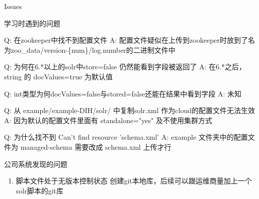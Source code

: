\documentclass[presentation]{beamer}
\begin{document}
\begin{frame}[label={sec:org7c8b5bf}]{Issues}
\begin{block}{学习时遇到的问题}
\begin{block}{Q: 在zookeeper中找不到配置文件}
A: 配置文件疑似在上传到zookeeper时放到了名为zoo\_data/version-\{num\}/log.number的二进制文件中
\end{block}


\begin{block}{Q: 为何在6.*以上的solr中store=false 仍然能看到字段被返回了}
A: 在6.*之后，string 的 docValues=true 为默认值
\end{block}


\begin{block}{Q: int类型为何docValues=false与stored=false还能在结果中看到字段}
A: 未知
\end{block}


\begin{block}{Q: 从 example/example-DIH/solr/ 中复制solr.xml 作为cloud的配置文件无法生效}
A: 因为默认的配置文件里面有 standalone="yes" 及不使用集群方式
\end{block}

\begin{block}{Q: 为什么找不到 Can't find resource 'schema.xml'}
A: example 文件夹中的配置文件为 managed-schema 需要改成 schema.xml 上传才行
\end{block}
\end{block}


\begin{block}{公司系统发现的问题}
\begin{enumerate}
\item 脚本文件处于无版本控制状态
创建git本地库，后续可以跟运维商量加上一个solr脚本的git库
\end{enumerate}
\end{block}
\end{frame}
\end{document}
